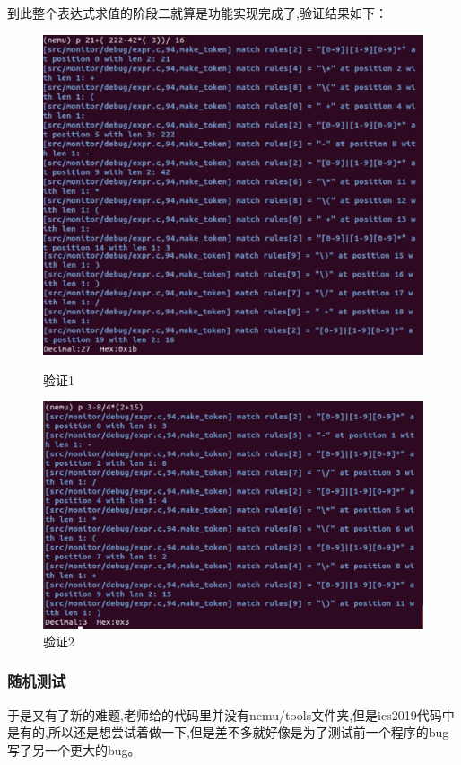 \documentclass[UTF8,a4paper,10pt]{ctexart}
\begin{document}
{    到此整个表达式求值的阶段二就算是功能实现完成了,验证结果如下：
    \begin{figure}[!h]
        \begin{minipage}[h]{0.5\linewidth}
        \centering
        \includegraphics[scale=0.15]{fig/7.jpg}
        \caption{验证1}
        \end{minipage}%
        \hfill
        \begin{minipage}[h]{0.5\linewidth}
        \centering
        \includegraphics[scale=0.3]{fig/8.png}
        \caption{验证2}
        \end{minipage}
    \end{figure}
\subsubsection{随机测试}
    于是又有了新的难题,老师给的代码里并没有nemu/tools文件夹,但是ics2019代码中是有的,所以还是想尝试着做一下,但是差不多就好像是为了测试前一个程序的bug写了另一个更大的bug。

}
\end{document}
